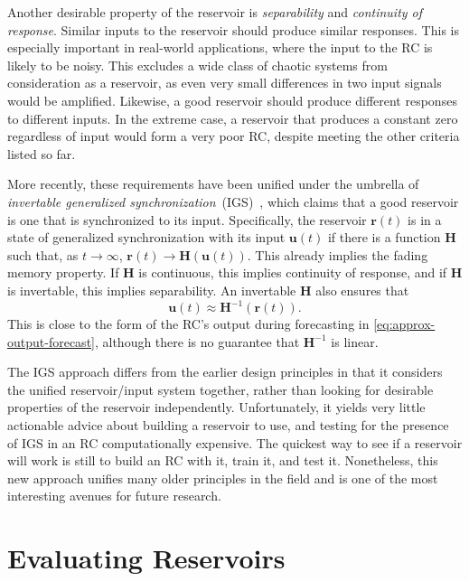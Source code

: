 Another desirable property of the reservoir is \emph{separability} and
\emph{continuity of response}. Similar inputs to the reservoir should produce
similar responses. This is especially important in real-world
applications, where the input to the RC is likely to be noisy. This
excludes a wide class of chaotic systems from consideration as a
reservoir, as even very small differences in two input signals would
be amplified. Likewise, a good reservoir should produce different
responses to different inputs. In the extreme case, a reservoir that
produces a constant zero regardless of input would form a very poor RC,
despite meeting the other criteria listed so far.

More recently, these requirements have been unified under the umbrella
of \emph{invertable generalized
  synchronization}~(IGS)~\cite{lu2018,lymburn2019,lu2020}, which claims that
a good reservoir is one that is synchronized to its
input. Specifically, the reservoir $\bm{r}(t)$ is in a state of
generalized synchronization with its input $\bm{u}(t)$ if there is a
function $\bm{H}$ such that, as $t \rightarrow \infty$, $\bm{r}(t)
\rightarrow \bm{H}\left(\bm{u}(t)\right)$. This already implies the
fading memory property. If $\bm{H}$ is continuous, this implies continuity of response, and if $\bm{H}$ is invertable, this implies separability. An invertable $\bm{H}$ also ensures that
\begin{equation}
  \bm{u}(t) \approx \bm{H}^{-1}\left(\bm{r}(t)\right).
\end{equation}
This is close to the form of the RC's output during forecasting in
\cref{eq:approx-output-forecast}, although there is no guarantee that
$\bm{H}^{-1}$ is linear.

The IGS approach differs from the earlier design principles in that it
considers the unified reservoir/input system together, rather than
looking for desirable properties of the reservoir
independently. Unfortunately, it yields very little actionable advice
about building a reservoir to use, and testing for the presence of IGS
in an RC computationally expensive. The quickest way to see if a
reservoir will work is still to build an RC with it, train it, and
test it. Nonetheless, this new approach unifies many older principles
in the field and is one of the most interesting avenues for future
research.

\section{Evaluating Reservoirs}

